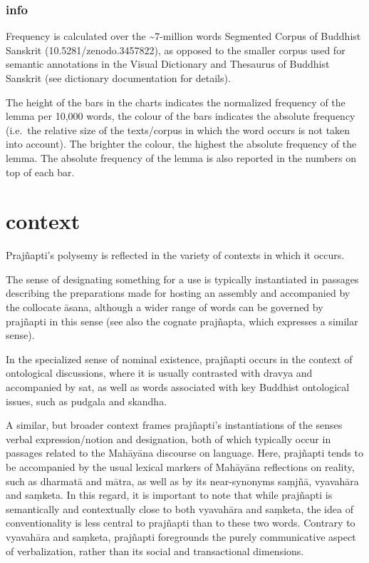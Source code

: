 \documentclass[
  letterpaper,
  DIV=11,
  numbers=noendperiod,
  oneside]{scrreprt}
\begin{document}
\hypertarget{info}{%
\subsubsection{info}\label{info}}

Frequency is calculated over the \textasciitilde7-million words
Segmented Corpus of Buddhist Sanskrit (10.5281/zenodo.3457822), as
opposed to the smaller corpus used for semantic annotations in the
Visual Dictionary and Thesaurus of Buddhist Sanskrit (see dictionary
documentation for details).

The height of the bars in the charts indicates the normalized frequency
of the lemma per 10,000 words, the colour of the bars indicates the
absolute frequency (i.e.~the relative size of the texts/corpus in which
the word occurs is not taken into account). The brighter the colour, the
highest the absolute frequency of the lemma. The absolute frequency of
the lemma is also reported in the numbers on top of each bar.

\hypertarget{sec-context}{%
\section{context}\label{sec-context}}

Prajñapti's polysemy is reflected in the variety of contexts in which it
occurs.

The sense of designating something for a use is typically instantiated
in passages describing the preparations made for hosting an assembly and
accompanied by the collocate āsana, although a wider range of words can
be governed by prajñapti in this sense (see also the cognate prajñapta,
which expresses a similar sense).

In the specialized sense of nominal existence, prajñapti occurs in the
context of ontological discussions, where it is usually contrasted with
dravya and accompanied by sat, as well as words associated with key
Buddhist ontological issues, such as pudgala and skandha.

A similar, but broader context frames prajñapti's instantiations of the
senses verbal expression/notion and designation, both of which typically
occur in passages related to the Mahāyāna discourse on language. Here,
prajñapti tends to be accompanied by the usual lexical markers of
Mahāyāna reflections on reality, such as dharmatā and mātra, as well as
by its near-synonyms saṃjñā, vyavahāra and saṃketa. In this regard, it
is important to note that while prajñapti is semantically and
contextually close to both vyavahāra and saṃketa, the idea of
conventionality is less central to prajñapti than to these two words.
Contrary to vyavahāra and saṃketa, prajñapti foregrounds the purely
communicative aspect of verbalization, rather than its social and
transactional dimensions.
\end{document}
